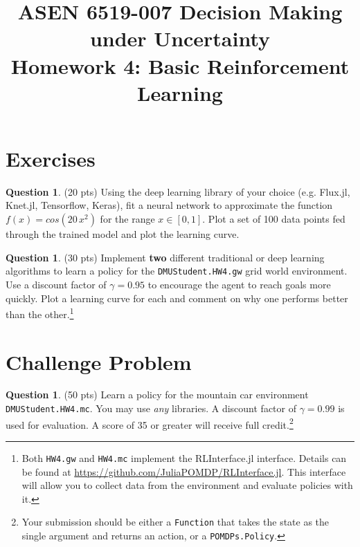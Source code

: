 \documentclass{article}
\title{ASEN 6519-007 Decision Making under Uncertainty\\
       Homework 4: Basic Reinforcement Learning}
\theoremstyle{definition}
\newtheorem{question}[thm]{Question}
\begin{document}
\maketitle

\section{Exercises}

\begin{question}
    (20 pts) Using the deep learning library of your choice (e.g. Flux.jl, Knet.jl, Tensorflow, Keras), fit a neural network to approximate the function $f(x) = cos(20\,x^2)$ for the range $x \in [0,1]$. Plot a set of 100 data points fed through the trained model and plot the learning curve.
\end{question}

\begin{question}
    (30 pts) Implement \textbf{two} different traditional or deep learning algorithms to learn a policy for the \texttt{DMUStudent.HW4.gw} grid world environment. Use a discount factor of $\gamma=0.95$ to encourage the agent to reach goals more quickly. Plot a learning curve for each and comment on why one performs better than the other.\footnote{\label{fn:rlinterface}Both \texttt{HW4.gw} and \texttt{HW4.mc} implement the RLInterface.jl interface. Details can be found at \url{https://github.com/JuliaPOMDP/RLInterface.jl}. This interface will allow you to collect data from the environment and evaluate policies with it.}
\end{question}

\section{Challenge Problem}

\begin{question}
    (50 pts) Learn a policy for the mountain car environment \texttt{DMUStudent.HW4.mc}. You may use \emph{any} libraries. A discount factor of $\gamma=0.99$ is used for evaluation. A score of 35 or greater will receive full credit.\footnotemark[1]\footnote{Your submission should be either a \texttt{Function} that takes the state as the single argument and returns an action, or a \texttt{POMDPs.Policy}.}
\end{question}
\end{document}
